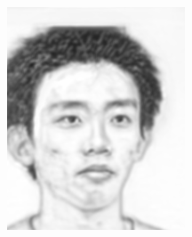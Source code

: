 \documentclass[10pt,twocolumn,letterpaper]{article}
\begin{document}
\begin{figure}[htbp]
{\begin{minipage}[b]{0.22\linewidth}
\includegraphics[width=0.99\linewidth]{img/light&pose_invariance/bfcn_p2.png}
\end{minipage}
}
\end{figure}
\end{document}

